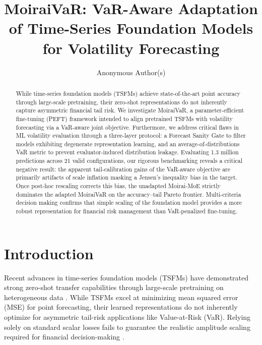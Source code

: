 \documentclass[runningheads]{llncs}
\begin{document}
\title{MoiraiVaR: VaR-Aware Adaptation of Time-Series Foundation Models
for Volatility Forecasting}

\author{Anonymous Author(s)}

\maketitle

\begin{abstract}
While time-series foundation models (TSFMs) achieve state-of-the-art point accuracy through large-scale pretraining, their zero-shot representations do not inherently capture asymmetric financial tail risk. We investigate MoiraiVaR, a parameter-efficient fine-tuning (PEFT) framework intended to align pretrained TSFMs with volatility forecasting via a VaR-aware joint objective. Furthermore, we address critical flaws in ML volatility evaluation through a three-layer protocol: a Forecast Sanity Gate to filter models exhibiting degenerate representation learning, and an average-of-distributions VaR metric to prevent evaluator-induced distribution leakage. Evaluating 1.3 million predictions across 21 valid configurations, our rigorous benchmarking reveals a critical negative result: the apparent tail-calibration gains of the VaR-aware objective are primarily artifacts of scale inflation masking a Jensen's inequality bias in the target. Once post-hoc rescaling corrects this bias, the unadapted Moirai-MoE strictly dominates the adapted MoiraiVaR on the accuracy--tail Pareto frontier. Multi-criteria decision making confirms that simple scaling of the foundation model provides a more robust representation for financial risk management than VaR-penalized fine-tuning.

\end{abstract}

\section{Introduction}

Recent advances in time-series foundation models (TSFMs) have demonstrated strong zero-shot transfer capabilities through large-scale pretraining on heterogeneous data \cite{woo2024,liu2025}. While TSFMs excel at minimizing mean squared error (MSE) for point forecasting, their learned representations do not inherently optimize for asymmetric tail-risk applications like Value-at-Risk (VaR). Relying solely on standard scalar losses fails to guarantee the realistic amplitude scaling required for financial decision-making \cite{bollerslev1986}.
\end{document}
